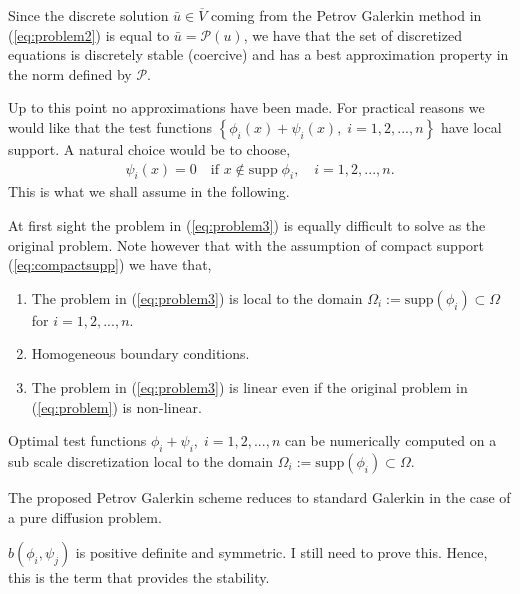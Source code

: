 \begin{remark} Since the discrete solution $\bar{u} \in \overline{V}$ coming from the Petrov Galerkin method in (\ref{eq:problem2}) is equal to $\bar{u} = \mathcal{P}(u)$, we have that the set of discretized equations is discretely stable (coercive) and has a best approximation property in the norm defined by $\mathcal{P}$.
\end{remark}

Up to this point no approximations have been made. For practical reasons we would like that the test functions $ \left\{ \phi_i(x) +  \psi_i(x), \; i=1,2,...,n   \right\} $ have local support. A natural choice would be to choose,
\begin{align}
	\psi_i(x) = 0 \quad \text{if } x \notin \mathrm{supp} \; \phi_i, \quad i = 1,2,...,n.
	\label{eq:compactsupp}
\end{align}
This is what we shall assume in the following.
\begin{remark} At first sight the problem in (\ref{eq:problem3}) is equally difficult to solve as the original problem. Note however that with the assumption of compact support (\ref{eq:compactsupp}) we have that,
	\begin{enumerate} 
		\item The problem in (\ref{eq:problem3}) is local to the domain $\Omega_i:=\mathrm{supp} \left(  \phi_i \right) \subset \Omega$ for $i=1,2,...,n$.
		\item Homogeneous boundary conditions.
		\item The problem in (\ref{eq:problem3}) is linear even if the original problem in (\ref{eq:problem}) is non-linear. 
	\end{enumerate}
\end{remark}

\begin{remark} Optimal test functions $\phi_i+\psi_i, \; i=1,2,...,n$ can be numerically computed on a sub scale discretization local to the domain $\Omega_i:=\mathrm{supp} \left(  \phi_i \right) \subset \Omega$. 
\end{remark}

\begin{remark} The proposed Petrov Galerkin scheme reduces to standard Galerkin in the case of a pure diffusion problem. 
\end{remark}

\begin{remark} $b(\phi_i, \psi_j)$  is positive definite and symmetric. I still need to prove this. Hence, this is the term that provides the stability.
\end{remark}

